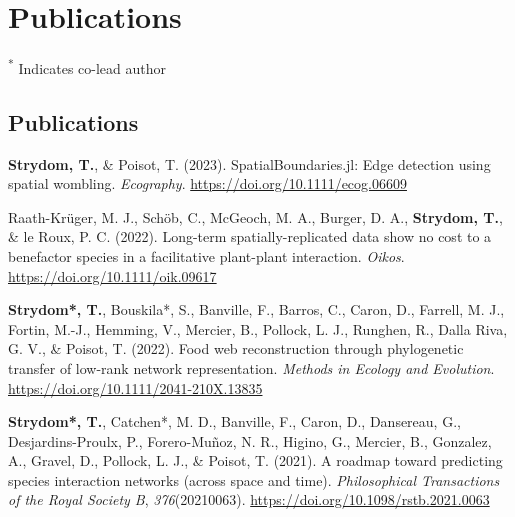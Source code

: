 \documentclass[11pt, a4paper]{awesome-cv}
\begin{document}
\newpage

\hypertarget{publications}{%
\section{Publications}\label{publications}}

\textsuperscript{*} Indicates co-lead author

\vspace{\baselineskip}

\hypertarget{publications-1}{%
\subsection{\texorpdfstring{\textbf{Publications}}{Publications}}\label{publications-1}}

\begingroup
\setlength{\parindent}{-0.5in}
\setlength{\leftskip}{0.5in}

\hypertarget{refs_journals}{}
\leavevmode{}%
\textbf{Strydom, T.}, \& Poisot, T. (2023). SpatialBoundaries.jl: Edge
detection using spatial wombling. \emph{Ecography}.
\url{https://doi.org/10.1111/ecog.06609}

\leavevmode{}%
Raath-Krüger, M. J., Schöb, C., McGeoch, M. A., Burger, D. A.,
\textbf{Strydom, T.}, \& le Roux, P. C. (2022). Long-term
spatially-replicated data show no cost to a benefactor species in a
facilitative plant-plant interaction. \emph{Oikos}.
\url{https://doi.org/10.1111/oik.09617}

\leavevmode{}%
\textbf{Strydom*, T.}, Bouskila*, S., Banville, F., Barros, C., Caron,
D., Farrell, M. J., Fortin, M.-J., Hemming, V., Mercier, B., Pollock, L.
J., Runghen, R., Dalla Riva, G. V., \& Poisot, T. (2022). Food web
reconstruction through phylogenetic transfer of low-rank network
representation. \emph{Methods in Ecology and Evolution}.
\url{https://doi.org/10.1111/2041-210X.13835}

\leavevmode{}%
\textbf{Strydom*, T.}, Catchen*, M. D., Banville, F., Caron, D.,
Dansereau, G., Desjardins-Proulx, P., Forero-Muñoz, N. R., Higino, G.,
Mercier, B., Gonzalez, A., Gravel, D., Pollock, L. J., \& Poisot, T.
(2021). A roadmap toward predicting species interaction networks (across
space and time). \emph{Philosophical Transactions of the Royal Society
B}, \emph{376}(20210063). \url{https://doi.org/10.1098/rstb.2021.0063}
\end{document}
